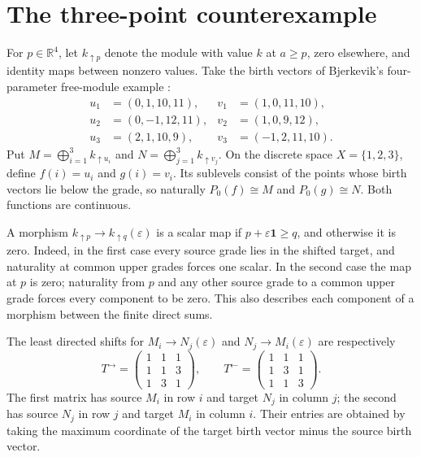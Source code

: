 \documentclass[11pt]{article}
\newcommand{\R}{\mathbb R}
\newcommand{\one}{\mathbf 1}
\begin{document}
\section{The three-point counterexample}

For $p\in\R^4$, let $k_{\uparrow p}$ denote the module with value $k$ at
$a\geq p$, zero elsewhere, and identity maps between nonzero values.
Take the birth vectors of Bjerkevik's four-parameter free-module example
\cite[Example 5.3]{Bjerkevik}:
\[
\begin{aligned}
 u_1&=(0,1,10,11),&v_1&=(1,0,11,10),\\
 u_2&=(0,-1,12,11),&v_2&=(1,0,9,12),\\
 u_3&=(2,1,10,9),&v_3&=(-1,2,11,10).
\end{aligned}
\]
Put $M=\bigoplus_{i=1}^3k_{\uparrow u_i}$ and
$N=\bigoplus_{j=1}^3k_{\uparrow v_j}$. On the discrete space
$X=\{1,2,3\}$, define $f(i)=u_i$ and $g(i)=v_i$. Its sublevels consist of
the points whose birth vectors lie below the grade, so naturally
$P_0(f)\cong M$ and $P_0(g)\cong N$. Both functions are continuous.

A morphism $k_{\uparrow p}\to k_{\uparrow q}(\varepsilon)$ is a scalar map
if $p+\varepsilon\one\geq q$, and otherwise it is zero. Indeed, in the first
case every source grade lies in the shifted target, and naturality at common
upper grades forces one scalar. In the second case the map at $p$ is zero;
naturality from $p$ and any other source grade to a common upper grade forces
every component to be zero. This also describes each component of a morphism
between the finite direct sums.

The least directed shifts for $M_i\to N_j(\varepsilon)$ and
$N_j\to M_i(\varepsilon)$ are respectively
\[
 T^{\to}=\begin{pmatrix}1&1&1\\1&1&3\\1&3&1\end{pmatrix},\qquad
 T^{\leftarrow}=\begin{pmatrix}1&1&1\\1&3&1\\1&1&3\end{pmatrix}.
\]
The first matrix has source $M_i$ in row $i$ and target $N_j$ in column $j$;
the second has source $N_j$ in row $j$ and target $M_i$ in column $i$.
Their entries are obtained by taking the maximum coordinate of the
target birth vector minus the source birth vector.
\end{document}
